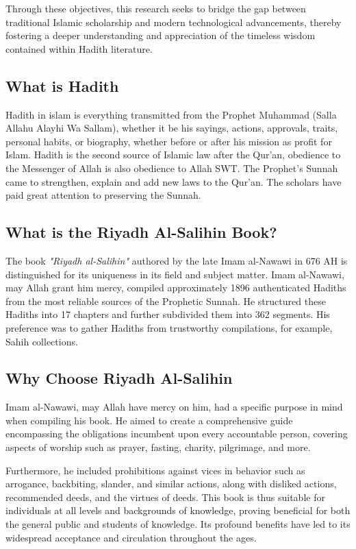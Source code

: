 \documentclass{svproc}
\begin{document}
Through these objectives, this research seeks to bridge the gap between traditional Islamic scholarship and modern technological advancements, thereby fostering a deeper understanding and appreciation of the timeless wisdom contained within Hadith literature.


\subsection{What is Hadith}
Hadith in islam is everything transmitted from the Prophet Muhammad (Salla Allahu Alayhi Wa Sallam), whether it be his sayings, actions, approvals, traits, personal habits, or biography, whether before or after his mission as profit for Islam. Hadith is the second source of Islamic law after the Qur'an, obedience to the Messenger of Allah is also obedience to Allah SWT. The Prophet's Sunnah came to strengthen, explain and add new laws to the Qur'an. The scholars have paid great attention to preserving the Sunnah.
\subsection{What is the Riyadh Al-Salihin Book?}

The book \textit{"Riyadh al-Salihin"} authored by the late Imam al-Nawawi in 676 AH is distinguished for its uniqueness in its field and subject matter. Imam al-Nawawi, may Allah grant him mercy, compiled approximately 1896 authenticated Hadiths from the most reliable sources of the Prophetic Sunnah. He structured these Hadiths into 17 chapters and further subdivided them into 362 segments. His preference was to gather Hadiths from trustworthy compilations, for example, Sahih collections. \cite{site1}


\subsection{Why Choose Riyadh Al-Salihin}

Imam al-Nawawi, may Allah have mercy on him, had a specific purpose in mind when compiling his book. He aimed to create a comprehensive guide encompassing the obligations incumbent upon every accountable person, covering aspects of worship such as prayer, fasting, charity, pilgrimage, and more. 

Furthermore, he included prohibitions against vices in behavior such as arrogance, backbiting, slander, and similar actions, along with disliked actions, recommended deeds, and the virtues of deeds. This book is thus suitable for individuals at all levels and backgrounds of knowledge, proving beneficial for both the general public and students of knowledge. Its profound benefits have led to its widespread acceptance and circulation throughout the ages.
\end{document}
